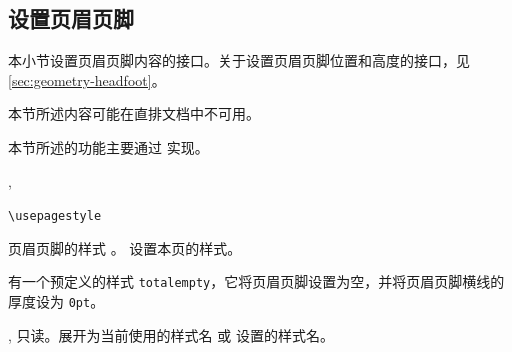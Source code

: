 \documentclass[twoside]{book}
\begin{document}




\subsection{设置页眉页脚}\label{sec:pagestyle}

本小节设置页眉页脚内容的接口。关于设置页眉页脚位置和高度的接口，见\cref{sec:geometry-headfoot}。

本节所述内容可能在直排文档中不可用。

本节所述的功能主要通过  实现。

\begin{function}{\usepagestyle, \usethispagestyle}
  \begin{syntax}
    \verb|\usepagestyle| 
  \end{syntax}
 页眉页脚的样式 。 设置本页的样式。

有一个预定义的样式 \texttt{totalempty}，它将页眉页脚设置为空，并将页眉页脚横线的厚度设为 \texttt{0pt}。
\end{function}

\begin{function}[EXP]{\@currpagestyle, \@specialstyle}
只读。展开为当前使用的样式名  或  设置的样式名。
\end{function}
\end{document}
